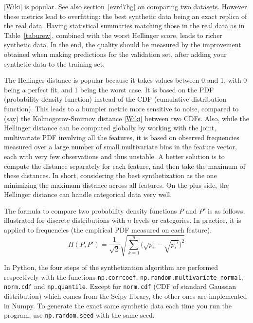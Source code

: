 \documentclass[oneside,10pt]{book}
\begin{document}
[\href{https://en.wikipedia.org/wiki/Hellinger_distance}{Wiki}] is popular.  See also section~\ref{evrd7hg} 
 on comparing two datasets. However these metrics lead to \textcolor{index}{overfitting}: the best synthetic data being an exact replica of the real data. Having statistical summaries matching those in the real data as in Table~\ref{taburew}, combined with the worst Hellinger score, leads to richer synthetic data. In the end, the quality should be measured by the improvement obtained when making predictions for the \textcolor{index}{validation set}, after adding your synthetic data to the training set.

The Hellinger distance is popular because it takes values between 0 and 1, with 0 being a perfect fit, and 1 being the worst case. It is based on the PDF (probability density function) instead of the CDF (cumulative distribution function). This leads to a bumpier metric more sensitive to noise, compared to (say) the 
\textcolor{index}{Kolmogorov-Smirnov distance}  [\href{https://en.wikipedia.org/wiki/Kolmogorov\%E2\%80\%93Smirnov_test}{Wiki}] between two CDFs.
Also, while the Hellinger distance can be computed globally by working with the joint, multivariate PDF involving all the features, it is based on  observed frequencies measured over a large number of small multivariate bins in the feature vector, each with very few observations and thus unstable.  A better solution is to compute the distance separately for each feature, and then take the maximum of these distances. In short, considering the best synthetization as the one minimizing the maximum distance across all features. On the plus side, the Hellinger distance can handle categorical data very well.

The formula to compare two probability density functions $P$ and $P'$ is as follows, illustrated for discrete distributions with $n$ levels or categories. In practice, it is applied to frequencies (the empirical PDF measured on each feature).
$$
H(P,P') = \frac{1}{\sqrt{2}} \sqrt{\sum_{k=1}^n \Big(\sqrt{p_i}-\sqrt{p_i'}\Big)^2}
$$

In Python, the four steps of the synthetization algorithm are performed respectively with the functions \texttt{np.corrcoef},
 \texttt{np.random.multivariate\_normal}, \texttt{norm.cdf}
 and \texttt{np.quantile}. Except for \texttt{norm.cdf} (CDF of standard Gaussian distribution) which comes from the Scipy library, the other ones are implemented in Numpy. To generate the exact same synthetic data each time you run the program, 
 use \texttt{np.random.seed} with the same \textcolor{index}{seed}. 
\end{document}
